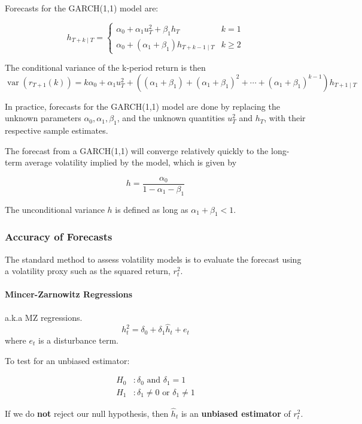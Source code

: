 \documentclass[11pt]{article}
\begin{document}
 Forecasts for the GARCH(1,1) model are:

 \begin{equation}
h_{T+k \mid T}= \begin{cases}\alpha_0+\alpha_1 u_T^2+\beta_1 h_T & k=1 \\ \alpha_0+\left(\alpha_1+\beta_1\right) h_{T+k-1 \mid T} & k \geqslant 2\end{cases}
\end{equation}

The conditional variance of the k-period return is then
\begin{equation}
\operatorname{var}\left(r_{T+1}(k)\right)=k \alpha_0+\alpha_1 u_T^2+\left(\left(\alpha_1+\beta_1\right)+\left(\alpha_1+\beta_1\right)^2+\cdots+\left(\alpha_1+\beta_1\right)^{k-1}\right) h_{T+1 \mid T}
\end{equation}

\begin{note}
    In practice, forecasts for the GARCH(1,1) model are done by replacing the unknown parameters $\alpha_0, \alpha_1, \beta_1$, and the unknown quantities $u_T^2$ and $h_T$, with their respective sample estimates.
\end{note}

 The forecast from a GARCH(1,1) will converge relatively quickly to the long-term average volatility implied by the model, which is given by

 \[h = \dfrac{\alpha_0}{1-\alpha_1-\beta_1}\]

 The unconditional variance $h$ is defined as long as $\alpha_1 + \beta_1 < 1$.

 \subsubsection{Accuracy of Forecasts}

 The standard method to assess volatility models is to evaluate the forecast using a volatility proxy such as the squared return, $r_t^2$.

 \paragraph{Mincer-Zarnowitz Regressions}
 a.k.a MZ regressions.
 \[h_t^2 = \delta_0 + \delta_1 \hat{h}_t + e_t\]
 where $e_t$ is a disturbance term.

 \begin{procedure}
     To test for an unbiased estimator:

     \begin{align*}
         H_0&: \delta_0 \text{ and } \delta_1 = 1 \\
         H_1&: \delta_1\neq0 \text { or } \delta_1 \neq1
     \end{align*}

     If we do \textbf{not} reject our null hypothesis, then $\hat{h}_t$ is an \textbf{unbiased estimator} of $r_t^2$.
 \end{procedure}
\end{document}
